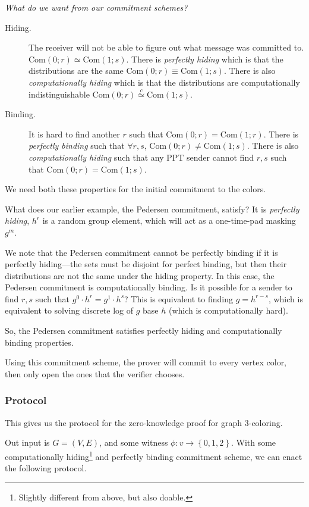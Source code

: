 \emph{What do we want from our commitment schemes?}
\begin{description}
    \item[Hiding.] The receiver will not be able to figure out what message was committed to. $\mathrm{Com}(0;r) \simeq \mathrm{Com}(1; s)$. There is \emph{perfectly hiding} which is that the distributions are the same $\mathrm{Com}(0;r) \equiv \mathrm{Com}(1; s)$. There is also \emph{computationally hiding} which is that the distributions are computationally indistinguishable $\mathrm{Com}(0;r) \overset{c}{\simeq} \mathrm{Com}(1; s)$.
    \item[Binding.] It is hard to find another $r$ such that $\mathrm{Com}(0;r) = \mathrm{Com}(1;r)$. There is \emph{perfectly binding} such that $\forall r, s$, $\mathrm{Com}(0;r) \neq \mathrm{Com}(1;s)$. There is also \emph{computationally hiding} such that any PPT sender cannot find $r,s$ such that $\mathrm{Com}(0;r) = \mathrm{Com}(1;s)$.
\end{description}

We need both these properties for the initial commitment to the colors.

What does our earlier example, the Pedersen commitment, satisfy? It is \emph{perfectly hiding}, $h^r$ is a random group element, which will act as a one-time-pad masking $g^m$.

We note that the Pedersen commitment cannot be perfectly binding if it is perfectly hiding---the sets must be disjoint for perfect binding, but then their distributions are not the same under the hiding property. In this case, the Pedersen commitment is computationally binding. Is it possible for a sender to find $r,s$ such that $g^0\cdot h^r = g^1\cdot h^s$? This is equivalent to finding $g = h^{r-s}$, which is equivalent to solving discrete log of $g$ base $h$ (which is computationally hard).

So, the Pedersen commitment satisfies perfectly hiding and computationally binding properties.

Using this commitment scheme, the prover will commit to every vertex color, then only open the ones that the verifier chooses.

\subsubsection{Protocol}
This gives us the protocol for the zero-knowledge proof for graph 3-coloring.

Out input is $G = (V,E)$, and some witness $\phi : v\to \left\{ 0, 1, 2 \right\}$. With some computationally hiding\footnote{Slightly different from above, but also doable.} and perfectly binding commitment scheme, we can enact the following protocol.

